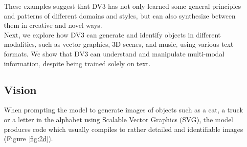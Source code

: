 These examples suggest that DV3 has not only learned some general principles and patterns of different domains and styles, but can also synthesize between them in creative and novel ways. \\

Next, we explore how DV3 can generate and identify objects in different modalities, such as vector graphics, 3D scenes, and music, using various text formats. We show that DV3 can understand and manipulate multi-modal information, despite being trained solely on text. 
\newpage
\subsection{Vision}
When prompting the model to generate images of objects such as a cat, a truck or a letter in the alphabet using Scalable Vector Graphics (SVG), the model produces code which usually compiles to rather detailed and identifiable images (Figure \ref{fig:2d}). 

